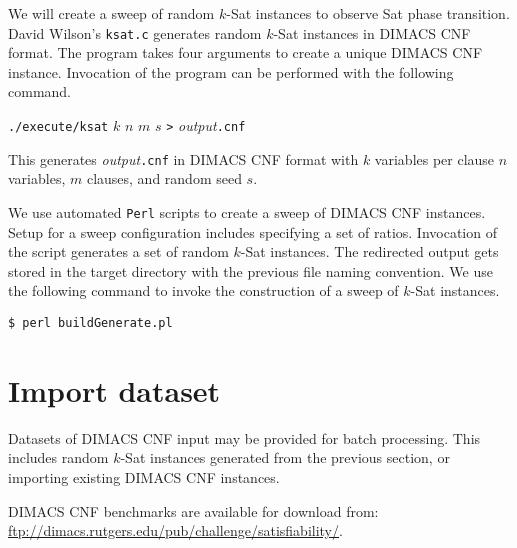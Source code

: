 	We will create a sweep of random $k$-{\sc Sat} instances to observe {\sc Sat} phase transition.  David Wilson's \texttt{ksat.c} generates random $k$-{\sc Sat} instances in DIMACS CNF format.  The program takes four arguments to create a unique DIMACS CNF instance.  Invocation of the program can be performed with the following command.

\begin{center}

\texttt{./execute/ksat} $k$ $n$ $m$ $s$ \texttt{>} \textit{output}\texttt{.cnf}

\end{center}

This generates \textit{output}\texttt{.cnf} in DIMACS CNF format with $k$ variables per clause $n$ variables, $m$ clauses, and random seed $s$.


We use automated \texttt{Perl} scripts to create a sweep of DIMACS CNF instances.  Setup for a sweep configuration includes specifying a set of ratios.  Invocation of the script generates a set of random $k$-{\sc Sat} instances.  The redirected output gets stored in the target directory with the previous file naming convention.  We use the following command to invoke the construction of a sweep of $k$-{\sc Sat} instances.


\begin{center}

\texttt{\$ perl buildGenerate.pl}

\end{center}






	\section{Import dataset}


Datasets of DIMACS CNF input may be provided for batch processing.  This includes random $k$-{\sc Sat} instances generated from the previous section, or importing existing DIMACS CNF instances.   


DIMACS CNF benchmarks are available for download from: \url{ftp://dimacs.rutgers.edu/pub/challenge/satisfiability/}.


